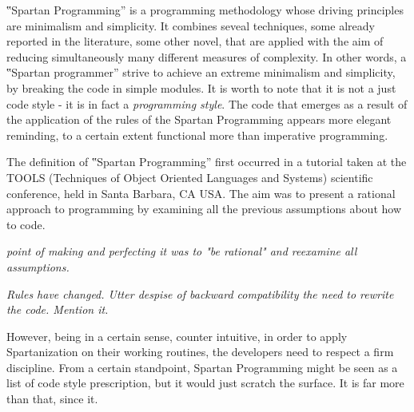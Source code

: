 
‟Spartan Programming” is a programming methodology whose driving principles are
minimalism and simplicity. It combines seveal techniques,
some already reported in the literature, some other novel, that are applied
with the aim of reducing
simultaneously many different measures of complexity.
In other words, a ‟Spartan programmer” strive
to achieve an extreme minimalism and simplicity, by breaking
the code in simple modules.
It is worth to note that it is not a just code style - it is in fact a \emph{programming style}.
The code that emerges as a result of the application of the rules of the
Spartan Programming appears more elegant reminding, to a certain extent
functional more than imperative programming.


The definition of ‟Spartan Programming” first occurred in a tutorial taken at
the TOOLS (Techniques of Object Oriented Languages and Systems) scientific conference,
held in Santa Barbara, CA USA. %
The aim was to present a rational approach to programming by examining all the previous
assumptions about how to code.

\emph{point of making and perfecting it was to "be rational" and
reexamine all assumptions.}

\emph{Rules have changed.
Utter despise of backward compatibility the need to rewrite the code.
Mention it.}


However, being in a certain sense, counter intuitive, in order to apply
Spartanization on their working routines, the developers need to respect a
firm discipline. From a certain standpoint, Spartan Programming might be
seen as a list of code style prescription, but it would just scratch the
surface. It is far more than that, since it.


